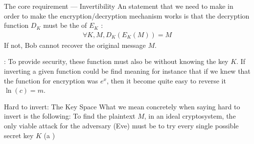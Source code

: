 \begin{parag}{The core requirement --- Invertibility}
    An statement that we need to make in order to make the encryption/decryption mechanism works is that the decryption function $D_K$ must be the  of $E_K$ :
	\begin{align*} 
		\forall K, M, D_K\left(E_K\left(M\right)\right) = M 
	\end{align*}
	If not, Bob cannot recover the original message $M$.
	\begin{framedremark}
	: To provide security, these function must also be  without knowing the key $K$. If inverting a given function could be find meaning for instance that if we knew that the function for encryption was $e^{x}$, then it become quite easy to reverse it $\ln\left(c\right) = m$.
	\end{framedremark}
\end{parag}
\begin{parag}{Hard to invert: The Key Space}
    What we mean concretely when saying hard to invert is the following: To find the plaintext $M$, in an ideal cryptosystem, the only viable attack for the adversary (Eve) must be to try every single possible secret key $K$ (a )
\end{parag}

